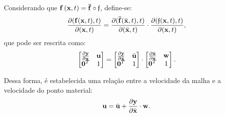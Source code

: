 Considerando que $\mathbf{f}\left(\mathbf{x},t\right) = \mathbf{\bar{f}} \circ \mathfrak{f}$, define-se:
\begin{align}
	\frac{\partial(\mathbf{f}(\mathbf{x},t),t)}{\partial(\mathbf{x},t)} = \frac{\partial(\mathbf{\bar{f}}(\bar{\mathbf{x}},t),t)}{\partial(\bar{\mathbf{x}},t)} \cdot \frac{\partial(\mathfrak{f}(\mathbf{x},t),t)}{\partial(\mathbf{x},t)},
\end{align}
\noindent que pode ser rescrita como:
\begin{align}
	\begin{bmatrix}
		\frac{\partial {\mathbf{y}}}{\partial {\mathbf{x}}} & \mathbf{u} \\
		\mathbf{0}^T & 1 \\
	\end{bmatrix}
	=
	\begin{bmatrix}
		\frac{\partial {\mathbf{y}}}{\partial {\bar{\mathbf{x}}}} & \bar{\mathbf{u}} \\
		\mathbf{0}^T & 1 \\
	\end{bmatrix}
	\cdot
	\begin{bmatrix}
		\frac{\partial {\bar{\mathbf{x}}}}{\partial {\mathbf{x}}} & \mathbf{w} \\
		\mathbf{0}^T & 1 \\
	\end{bmatrix} .
\end{align}

Dessa forma, é estabelecida uma relação entre a velocidade da malha e a velocidade do ponto material:
\begin{align}
	\mathbf{u} = \bar{\mathbf{u}} + \frac{\partial{\mathbf{y}}}{\partial{\bar{\mathbf{x}}}}\cdot \mathbf{w}. \label{eq:vel_rel_mat_ALE}
\end{align}

